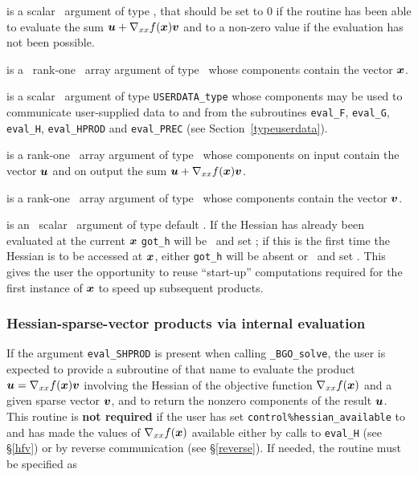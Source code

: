 \documentclass{galahad}
\newcommand{\packagename}{BGO}
\newcommand{\fullpackagename}{\libraryname\_\packagename}
\newcommand{\solver}{{\tt \fullpackagename\_solve}}
\begin{document}
\begin{description}
 is a scalar \intentout\ argument of type \integer,
that should be set to 0 if the routine has been able to evaluate the
sum ${\bm{u}} + \nabla_{xx} f({\bm{x}}) {\bm{v}}$
and to a non-zero value if the evaluation has not been possible.

 is a \ rank-one \intentin\ array argument of type
\realdp\ whose components contain the vector ${\bm{x}}$.

 is a scalar \intentinout\ argument of type
{\tt USERDATA\_type} whose components may be used
to communicate user-supplied data to and from the
subroutines {\tt eval\_F}, {\tt eval\_G},
{\tt eval\_H}, {\tt eval\_HPROD} and {\tt eval\_PREC}
(see Section~\ref{typeuserdata}).

 is a rank-one \intentinout\ array argument of type \realdp\
whose components on input contain the vector ${\bm{u}}$ and on output the
sum ${\bm{u}} + \nabla_{xx} f({\bm{x}}) {\bm{v}}$.

 is a rank-one \intentin\ array argument of type \realdp\
whose components contain the vector ${\bm{v}}$.

 is an \optional\ scalar \intentin\ argument of type default
\logical. If the Hessian has already been evaluated at the current ${\bm{x}}$
{\tt got\_h} will be \present\ and set \true; if this is the first time
the Hessian is to be accessed at ${\bm{x}}$, either {\tt got\_h} will be absent
or \present\ and set \false. This gives the user the opportunity
to reuse ``start-up'' computations required for the first instance of
${\bm{x}}$ to speed up subsequent products.

\end{description}


\subsubsection{Hessian-sparse-vector products via internal evaluation\label{hvsv}}

If the argument {\tt eval\_SHPROD} is present when calling \solver, the
user is expected to provide a subroutine of that name to evaluate the
product ${\bm{u}} = \nabla_{xx} f({\bm{x}}) {\bm{v}}$ involving 
the Hessian of the objective function $\nabla_{xx} f({\bm{x}})$
and a given sparse vector ${\bm{v}}$, and to return the nonzero components 
of the result ${\bm{u}}$. 
This routine is {\bf not required} if the user has set 
{\tt control\%hessian\_available} to \true\, and has made 
the values of $\nabla_{xx} f({\bm{x}})$ available either by calls to 
{\tt eval\_H} (see \S\ref{hfv})
or by reverse communication (see \S\ref{reverse}).
If needed, the routine must be specified as
\end{document}
